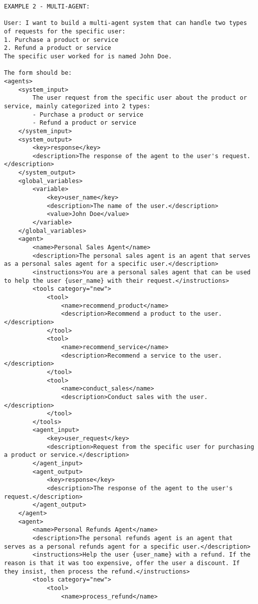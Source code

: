 \begin{lstlisting}
EXAMPLE 2 - MULTI-AGENT:

User: I want to build a multi-agent system that can handle two types of requests for the specific user:
1. Purchase a product or service
2. Refund a product or service
The specific user worked for is named John Doe.

The form should be:
<agents>
    <system_input>
        The user request from the specific user about the product or service, mainly categorized into 2 types:
        - Purchase a product or service
        - Refund a product or service
    </system_input>
    <system_output>
        <key>response</key>
        <description>The response of the agent to the user's request.</description>
    </system_output>
    <global_variables>
        <variable>
            <key>user_name</key>
            <description>The name of the user.</description>
            <value>John Doe</value>
        </variable>
    </global_variables>
    <agent>
        <name>Personal Sales Agent</name>
        <description>The personal sales agent is an agent that serves as a personal sales agent for a specific user.</description>
        <instructions>You are a personal sales agent that can be used to help the user {user_name} with their request.</instructions>
        <tools category="new">
            <tool>
                <name>recommend_product</name>
                <description>Recommend a product to the user.</description>
            </tool>
            <tool>
                <name>recommend_service</name>
                <description>Recommend a service to the user.</description>
            </tool>
            <tool>
                <name>conduct_sales</name>
                <description>Conduct sales with the user.</description>
            </tool>
        </tools>
        <agent_input>
            <key>user_request</key>
            <description>Request from the specific user for purchasing a product or service.</description>
        </agent_input>
        <agent_output>
            <key>response</key>
            <description>The response of the agent to the user's request.</description>
        </agent_output>
    </agent>
    <agent>
        <name>Personal Refunds Agent</name>
        <description>The personal refunds agent is an agent that serves as a personal refunds agent for a specific user.</description>
        <instructions>Help the user {user_name} with a refund. If the reason is that it was too expensive, offer the user a discount. If they insist, then process the refund.</instructions>
        <tools category="new">
            <tool>
                <name>process_refund</name>

\end{lstlisting}
